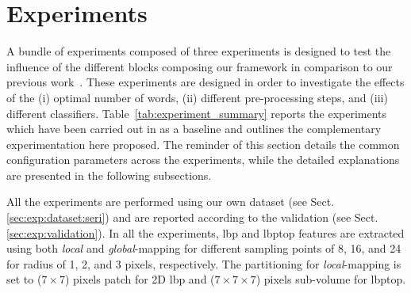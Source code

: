  \graphicspath{ {./content/experiment/figures/} }

\section{Experiments}
\label{sec:exp} 
A bundle of experiments composed of three experiments is designed to test the influence of the different blocks composing our framework in comparison to our previous work~\cite{Lemaintre2015miccaiOCT}.
These experiments are designed in order to investigate the effects of the (i) optimal number of words, (ii) different pre-processing steps, and (iii) different classifiers.
Table~\ref{tab:experiment_summary} reports the experiments which have been carried out in \cite{Lemaintre2015miccaiOCT} as a baseline and outlines the complementary experimentation here proposed.
The reminder of this section details the common configuration parameters across the experiments, while the detailed explanations are presented in the following 
subsections. 

All the experiments are performed using our own dataset (see Sect.\,\ref{sec:exp:dataset:seri}) and are reported according to the validation (see Sect.\,\ref{sec:exp:validation}).
In all the experiments, \ac{lbp} and \ac{lbptop} features are extracted using both \emph{local} and \emph{global}-mapping for different sampling points of 8, 16, and 24 for radius of 1, 2, and 3 pixels, respectively.
The partitioning for \emph{local}-mapping is set to ($7 \times 7$) pixels patch for 2D \ac{lbp} and ($ 7 \times 7 \times 7$) pixels sub-volume for \ac{lbptop}.


